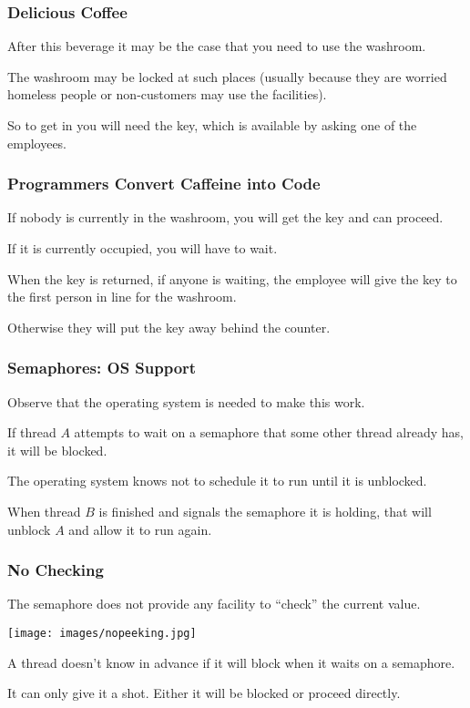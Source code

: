 \begin{frame}
	\frametitle{Delicious Coffee}

	After this beverage it may be the case that you need to use the washroom.

	The washroom may be locked at such places (usually because they are worried homeless people or non-customers may use the facilities).

	So to get in you will need the key, which is available by asking one of the employees.

\end{frame}

\begin{frame}
	\frametitle{Programmers Convert Caffeine into Code}

	If nobody is currently in the washroom, you will get the key and can proceed.

	If it is currently occupied, you will have to wait.

	When the key is returned, if anyone is waiting, the employee will give the key to the first person in line for the washroom.

	Otherwise they will put the key away behind the counter.


\end{frame}

\begin{frame}
	\frametitle{Semaphores: OS Support}

	Observe that the operating system is needed to make this work.

	If thread $A$ attempts to wait on a semaphore that some other thread already has, it will be blocked.

	The operating system knows not to schedule it to run until it is unblocked.

	When thread $B$ is finished and signals the semaphore it is holding, that will unblock $A$ and allow it to run again.


\end{frame}

\begin{frame}
	\frametitle{No Checking}

	The semaphore does not provide any facility to ``check'' the current value.

	\begin{center}
		\texttt{[image: images/nopeeking.jpg]}
	\end{center}

	A thread doesn't know in advance if it will block when it waits on a semaphore.

	It can only give it a shot. Either it will be blocked or proceed directly.

\end{frame}

